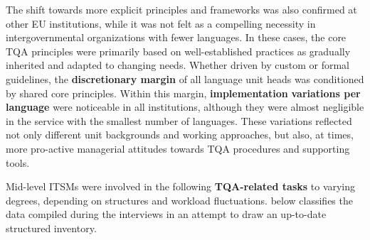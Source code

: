 \documentclass[output=paper]{langsci/langscibook}
\begin{document}
The shift towards more explicit principles and frameworks was also confirmed at other EU institutions, while it was not felt as a compelling necessity in intergovernmental organizations with fewer languages. In these cases, the core TQA principles were primarily based on well-established practices as gradually inherited and adapted to changing needs. Whether driven by custom or formal guidelines, the \textbf{discretionary margin} of all language unit heads was conditioned by shared core principles. Within this margin, \textbf{implementation} \textbf{variations per language} were noticeable in all institutions, although they were almost negligible in the service with the smallest number of languages. These variations reflected not only different unit backgrounds and working approaches, but also, at times, more pro-active managerial attitudes towards TQA procedures and supporting tools.



Mid-level ITSMs were involved in the following \textbf{TQA-related tasks} to varying degrees, depending on structures and workload fluctuations.  below classifies the data compiled during the interviews in an attempt to draw an up-to-date structured inventory.

 
\end{document}
